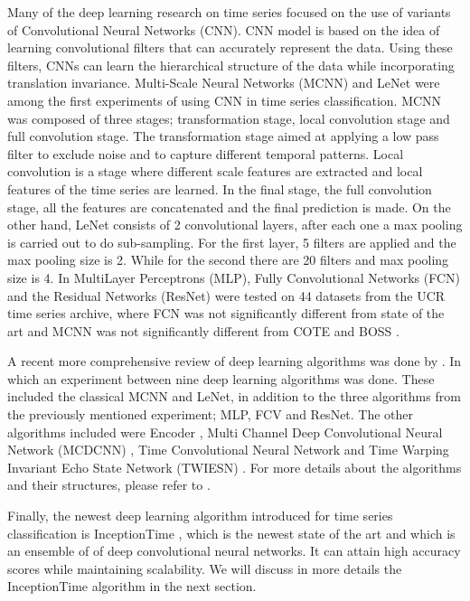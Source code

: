 Many of the deep learning research on time series focused on the use of variants of Convolutional Neural Networks (CNN). \cite{fawaz2019deep}
CNN model is based on the idea of learning convolutional filters that can accurately represent the data. Using these filters, CNNs can learn the hierarchical
structure of the data while incorporating translation invariance\cite{le2016data}.
Multi-Scale Neural Networks (MCNN) \cite{cui2016multi} and LeNet \cite{le2016data} were among the first experiments of using CNN in time series classification.
MCNN was composed of three stages; transformation stage, local convolution stage and full convolution stage. The transformation stage aimed at applying a low pass filter to exclude noise
and to capture different temporal patterns. Local convolution is a stage where different scale features are extracted and local features of the time series are learned.
In the final stage, the full convolution stage, all the features are concatenated and the final prediction is made.
On the other hand, LeNet consists of 2 convolutional layers, after each one a max pooling is carried out to do sub-sampling.
For the first layer, 5 filters are applied and the max pooling size is 2. While for the second there are 20 filters and max pooling size is 4.
In \cite{wang2017time} MultiLayer Perceptrons (MLP), Fully Convolutional Networks (FCN) and the Residual Networks (ResNet) were tested on 44 datasets from the
UCR time series archive, where FCN was not significantly different from state of the art and MCNN was not significantly different from COTE and BOSS \cite{schafer2017fast}.

A recent more comprehensive review of deep learning algorithms was done by \cite{fawaz2019deepreview}.
In which an experiment between nine deep learning algorithms was done.
These included the classical MCNN and LeNet, in addition to the three algorithms from the previously mentioned experiment; MLP, FCV and ResNet.
The other algorithms included were Encoder \cite{serra2018towards}, Multi Channel Deep Convolutional Neural Network (MCDCNN) \cite{zheng2014time,zheng2016exploiting},
Time Convolutional Neural Network \cite{zhao2017convolutional} and Time Warping Invariant Echo State Network (TWIESN) \cite{tanisaro2016time}.
For more details about the algorithms and their structures, please refer to \cite{fawaz2019deepreview}.

Finally, the newest deep learning algorithm introduced for time series classification is InceptionTime \cite{fawaz2020inceptiontime}, which is the newest state of the art
and which is an ensemble of of deep convolutional neural networks. It can attain high accuracy scores while maintaining scalability.
We will discuss in more details the InceptionTime algorithm in the next section.

